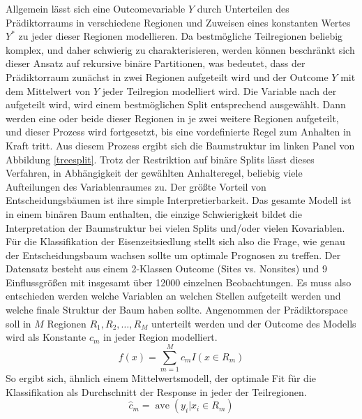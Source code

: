 Allgemein lässt sich eine Outcomevariable $Y$ durch Unterteilen des Prädiktorraums in verschiedene Regionen und Zuweisen eines konstanten Wertes $Y^{*}$ zu jeder dieser Regionen modellieren. Da bestmögliche Teilregionen beliebig komplex, und daher schwierig zu charakterisieren, werden können beschränkt sich dieser Ansatz auf rekursive binäre Partitionen, was bedeutet, dass der Prädiktorraum zunächst in zwei Regionen aufgeteilt wird und der Outcome $Y$ mit dem Mittelwert von $Y$ jeder Teilregion modelliert wird. Die Variable nach der aufgeteilt wird, wird einem bestmöglichen Split entsprechend ausgewählt. Dann werden eine oder beide dieser Regionen in je zwei weitere Regionen aufgeteilt, und dieser Prozess wird fortgesetzt, bis eine vordefinierte Regel zum Anhalten in Kraft tritt. \cite{treesplit} Aus diesem Prozess ergibt sich die Baumstruktur im linken Panel von Abbildung \ref{treesplit}. Trotz der Restriktion auf binäre Splits lässt dieses Verfahren, in Abhängigkeit der gewählten Anhalteregel, beliebig viele Aufteilungen des Variablenraumes zu. Der größte Vorteil von Entscheidungsbäumen ist ihre simple Interpretierbarkeit. Das gesamte Modell ist in einem binären Baum enthalten, die einzige Schwierigkeit bildet die Interpretation der Baumstruktur bei vielen Splits und/oder vielen Kovariablen. \\
Für die Klassifikation der Eisenzeitsiedlung stellt sich also die Frage, wie genau der Entscheidungsbaum wachsen sollte um optimale Prognosen zu treffen. Der Datensatz besteht aus einem 2-Klassen Outcome (Sites vs. Nonsites) und 9 Einflussgrößen mit insgesamt über 12000 einzelnen Beobachtungen. Es muss also entschieden werden welche Variablen an welchen Stellen aufgeteilt werden und welche finale Struktur der Baum haben sollte. Angenommen der Prädiktorspace soll in $M$ Regionen $R_{1}, R_{2}, \ldots, R_{M}$ unterteilt werden und der Outcome des Modells wird als Konstante $ c_{m}$ in jeder Region modelliert. 
\begin{equation}
    \label{treemodel}
    f(x)=\sum_{m=1}^{M} c_{m} I\left(x \in R_{m}\right)
\end{equation}
So ergibt sich, ähnlich einem Mittelwertsmodell, der optimale Fit für die Klassifikation als Durchschnitt der Response in jeder der Teilregionen. 
\begin{equation}
    \label{leastsquarestree}
    \hat{c}_{m}=\operatorname{ave}\left(y_{i} | x_{i} \in R_{m}\right)
\end{equation}

